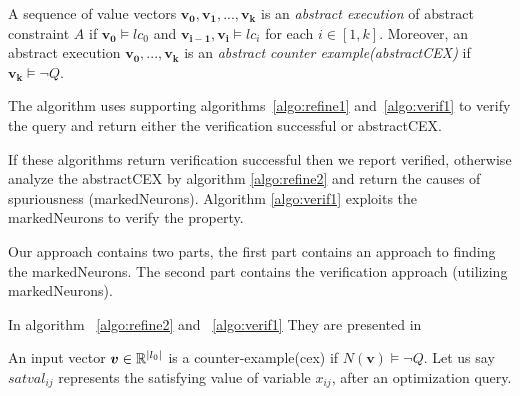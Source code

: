 \begin{df}
  A sequence of value vectors $\boldsymbol{v_0}, \boldsymbol{v_1}, ... , \boldsymbol{v_k}$ is an 
  {\em abstract execution} of abstract constraint $A$ if 
  $\boldsymbol{v_0} \models lc_0$ and $\boldsymbol{v_{i-1}}, \boldsymbol{v_i} \models lc_i$ for each $i \in [1,k]$.  
 Moreover, an abstract execution $\boldsymbol{v_0,...,v_k}$ is
 an {\em abstract counter example(abstractCEX)} if $\boldsymbol{v_k} \models \lnot Q$.
\end{df}


%
The algorithm uses supporting algorithms~\ref{algo:refine1} and~\ref{algo:verif1} to
verify the query and return either the verification successful or abstractCEX. 



If these algorithms return verification successful then we report verified,
otherwise analyze the abstractCEX by algorithm \ref{algo:refine2} and return the causes of spuriousness (markedNeurons). 
Algorithm \ref{algo:verif1} exploits the markedNeurons to verify the property. 

Our approach contains two parts, the first part contains an approach to finding the markedNeurons. 
The second part contains the verification approach (utilizing markedNeurons).


In algorithm ~\ref{algo:refine2} and ~\ref{algo:verif1}
They are presented in 



An input vector $\boldsymbol{v} \in \mathbb{R}^{|l_0|}$ is a counter-example(cex) if $N(\boldsymbol{v}) \models \lnot Q$. 
Let us say $satval_{ij}$ represents the satisfying value of variable $x_{ij}$, after an optimization query. 






